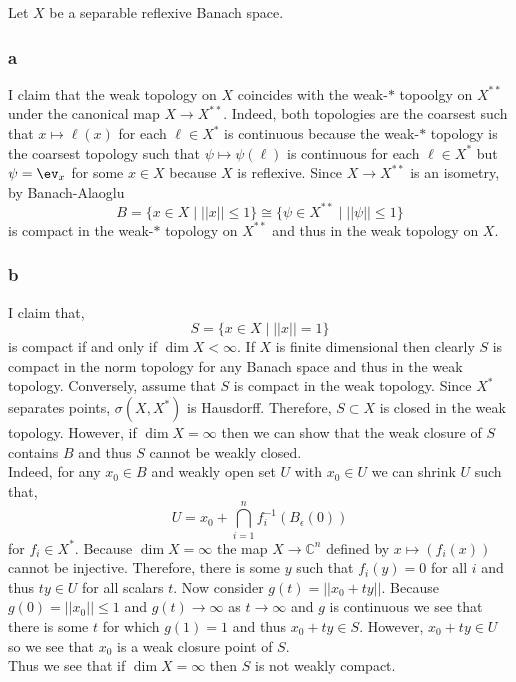 \documentclass[12pt]{article}
\renewcommand{\C}{\mathbb{C}}
\begin{document}
Let $X$ be a separable reflexive Banach space.

\subsubsection{a}

I claim that the weak topology on $X$ coincides with the weak-$*$ topoolgy on $X^{**}$ under the canonical map $X \to X^{**}$. Indeed, both topologies are the coarsest such that $x \mapsto \ell(x)$ for each $\ell \in X^*$ is continuous because the weak-$*$ topology is the coarsest topology such that $\psi \mapsto \psi(\ell)$ is continuous for each $\ell \in X^*$ but $\psi = \ev_x$ for some $x \in X$ because $X$ is reflexive. Since $X \to X^{**}$ is an isometry, by Banach-Alaoglu 
\[ B = \{ x \in X \mid || x || \le 1 \} \cong \{ \psi \in X^{**} \mid || \psi || \le 1 \} \]
is compact in the weak-$*$ topology on $X^{**}$ and thus in the weak topology on $X$.

\subsubsection{b}

I claim that,
\[ S = \{ x \in X \mid || x || = 1 \} \]
is compact if and only if $\dim{X} < \infty$. If $X$ is finite dimensional then clearly $S$ is compact in the norm topology for any Banach space and thus in the weak topology. Conversely, assume that $S$ is compact in the weak topology. Since $X^*$ separates points, $\sigma(X, X^*)$ is Hausdorff. Therefore, $S \subset X$ is closed in the weak topology. However, if $\dim{X} = \infty$ then we can show that the weak closure of $S$ contains $B$ and thus $S$ cannot be weakly closed. 
\bigskip\\
Indeed, for any $x_0 \in B$ and weakly open set $U$ with $x_0 \in U$ we can shrink $U$ such that,
\[ U = x_0  + \bigcap_{i = 1}^n f_i^{-1}(B_\epsilon(0)) \]
for $f_i \in X^*$. Because $\dim{X} = \infty$ the map $X \to \C^n$ defined by $x \mapsto (f_i(x))$ cannot be injective. Therefore, there is some $y$ such that $f_i(y) = 0$ for all $i$ and thus $t y \in U$ for all scalars $t$. Now consider $g(t) = || x_0 + t y ||$. Because $g(0) = || x_0 || \le 1$ and $g(t) \to \infty$ as $t \to \infty$ and $g$ is continuous we see that there is some $t$ for which $g(1) = 1$ and thus $x_0 + t y \in S$. However, $x_0 + t y \in U$ so we see that $x_0$ is a weak closure point of $S$.
\bigskip\\
Thus we see that if $\dim{X} = \infty$ then $S$ is not weakly compact.
\end{document}
